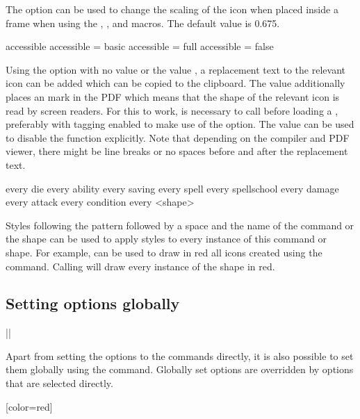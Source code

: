 \documentclass[a4paper]{article}
\begin{document}
The  option can be used to change the scaling of the icon when placed inside a frame when using the \macro{\ability}, \macro{\saving}, \macro{\spellschool} and \macro{\damage} macros. The default value is 0.675.

\begin{macrodef}
accessible
accessible = basic
accessible = full
accessible = false
\end{macrodef}
Using the  option with no value or the value , a replacement text to the relevant icon can be added which can be copied to the clipboard. The value  additionally places an \macro{\Alt} mark in the PDF which means that the shape of the relevant icon is read by screen readers. For this to work, is necessary to call \macro{\DocumentMetadata{}} before loading a \macro{\documentclass}, preferably with tagging enabled to make use of the  option. The value  can be used to disable the function explicitly. Note that depending on the compiler and PDF viewer, there might be line breaks or no spaces before and after the replacement text. 

\begin{macrodef}
every die
every ability
every saving
every spell
every spellschool
every damage
every attack
every condition
every <shape>
\end{macrodef}
Styles following the pattern  followed by a space and the name of the command or the shape can be used to apply styles to every instance of this command or shape. For example,  can be used to draw in red all icons created using the \macro{\die} command. Calling  will draw every instance of the  shape in red.

\subsection{Setting options globally}

\begin{macrodef}
|\rpgiconsset|
\end{macrodef}
Apart from setting the options to the commands directly, it is also possible to set them globally using the \macro{\rpgiconsset} command. Globally set options are overridden by options that are selected directly.

\begin{codeexample}

[color=red]
\end{codeexample}
\end{document}
